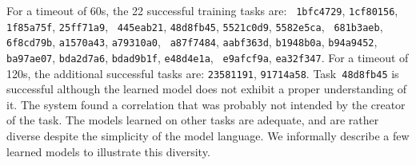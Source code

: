 \documentclass[a4paper]{llncs}
\begin{document}
For a timeout of 60s, the 22 successful training tasks are: {\tt
  1bfc4729}, {\tt 1cf80156}, {\tt 1f85a75f}, {\tt 25ff71a9}, {\tt
  445eab21}, {\tt 48d8fb45}, {\tt 5521c0d9}, {\tt 5582e5ca}, {\tt
  681b3aeb}, {\tt 6f8cd79b}, {\tt a1570a43}, {\tt a79310a0}, {\tt
  a87f7484}, {\tt aabf363d}, {\tt b1948b0a}, {\tt b94a9452}, {\tt
  ba97ae07}, {\tt bda2d7a6}, {\tt bdad9b1f}, {\tt e48d4e1a}, {\tt
  e9afcf9a}, {\tt ea32f347}.  For a timeout of 120s, the additional
successful tasks are: {\tt 23581191}, {\tt 91714a58}.
%
Task~{\tt 48d8fb45} is successful although the learned model does not
exhibit a proper understanding of it. The system found a correlation
that was probably not intended by the creator of the task.
%
The models learned on other tasks are adequate, and are rather diverse
despite the simplicity of the model language. We informally describe a
few learned models to illustrate this diversity.
\end{document}
